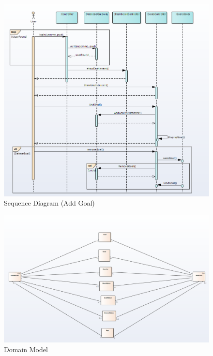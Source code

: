 \documentclass[10pt]{article}
\begin{document}
\begin{figure}[h!]
	\begin{center}
		\includegraphics[width=\columnwidth]{UC4.png}
		\caption{{Sequence Diagram (Add Goal)
				{\label{div-291050}}%
		}}
	\end{center}
\end{figure}


\begin{figure}[h!]
	\begin{center}
		\includegraphics[width=\columnwidth]{Domain.png}
		\caption{{Domain Model
				{\label{div-291050}}%
		}}
	\end{center}
\end{figure}
\end{document}
